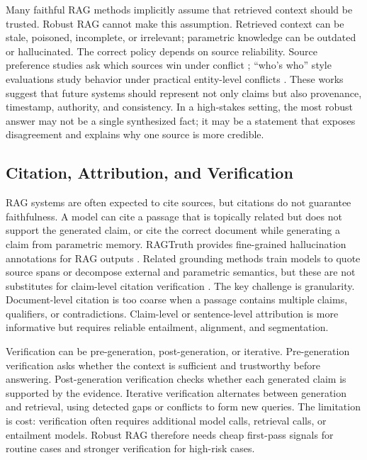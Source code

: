 \documentclass[11pt]{article}
\begin{document}
Many faithful RAG methods implicitly assume that retrieved context should be trusted. Robust RAG cannot make this assumption. Retrieved context can be stale, poisoned, incomplete, or irrelevant; parametric knowledge can be outdated or hallucinated. The correct policy depends on source reliability. Source preference studies ask which sources win under conflict \citep{rrag132}; ``who's who'' style evaluations study behavior under practical entity-level conflicts \citep{rrag110}. These works suggest that future systems should represent not only claims but also provenance, timestamp, authority, and consistency. In a high-stakes setting, the most robust answer may not be a single synthesized fact; it may be a statement that exposes disagreement and explains why one source is more credible.

\subsection{Citation, Attribution, and Verification}

RAG systems are often expected to cite sources, but citations do not guarantee faithfulness. A model can cite a passage that is topically related but does not support the generated claim, or cite the correct document while generating a claim from parametric memory. RAGTruth provides fine-grained hallucination annotations for RAG outputs \citep{ragTruth2024}. Related grounding methods train models to quote source spans or decompose external and parametric semantics, but these are not substitutes for claim-level citation verification \citep{rrag115,rrag206}. The key challenge is granularity. Document-level citation is too coarse when a passage contains multiple claims, qualifiers, or contradictions. Claim-level or sentence-level attribution is more informative but requires reliable entailment, alignment, and segmentation.

Verification can be pre-generation, post-generation, or iterative. Pre-generation verification asks whether the context is sufficient and trustworthy before answering. Post-generation verification checks whether each generated claim is supported by the evidence. Iterative verification alternates between generation and retrieval, using detected gaps or conflicts to form new queries. The limitation is cost: verification often requires additional model calls, retrieval calls, or entailment models. Robust RAG therefore needs cheap first-pass signals for routine cases and stronger verification for high-risk cases.
\end{document}
